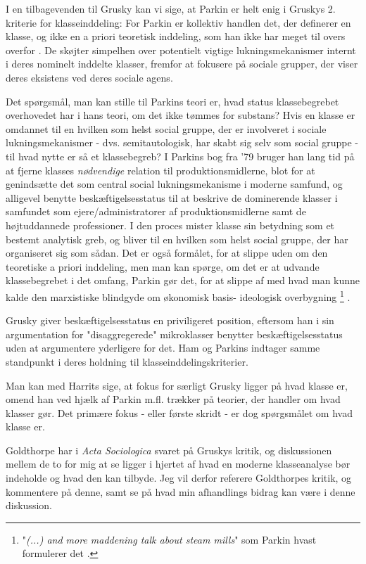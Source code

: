 I en tilbagevenden til Grusky kan vi sige, at Parkin er helt enig i Gruskys 2. kriterie for klasseinddeling: For Parkin er kollektiv handlen det, der definerer en klasse, og ikke en a priori teoretisk inddeling, som han ikke har meget til overs overfor \parencite[113]{Parkin1979}. De skøjter simpelhen over potentielt vigtige lukningsmekanismer internt i deres nominelt inddelte klasser, fremfor at fokusere på sociale grupper, der viser deres eksistens ved deres sociale agens. 

Det spørgsmål, man kan stille til Parkins teori er, hvad status klassebegrebet overhovedet har i hans teori, om det ikke tømmes for substans? Hvis en klasse er omdannet til en hvilken som helst social gruppe, der er involveret i sociale lukningsmekanismer - dvs. semitautologisk, har skabt sig selv som social gruppe - til hvad nytte er så et klassebegreb? I Parkins bog fra '79 bruger han lang tid på at fjerne klasses \emph{nødvendige} relation til produktionsmidlerne, blot for at genindsætte det som central social lukningsmekanisme i moderne samfund, og alligevel benytte beskæftigelsesstatus til at beskrive de dominerende klasser i samfundet som ejere/administratorer af produktionsmidlerne samt de højtuddannede professioner. I den proces mister klasse sin betydning som et bestemt analytisk greb, og bliver til en hvilken som helst social gruppe, der har organiseret sig som sådan. Det er også formålet, for at slippe uden om den teoretiske a priori inddeling, men man kan spørge, om det er at udvande klassebegrebet i det omfang, Parkin gør det, for at slippe af med hvad man kunne kalde den marxistiske blindgyde om økonomisk basis- ideologisk overbygning%
%
\footnote{"\emph{(...) and more maddening talk about steam mills}" som Parkin hvast formulerer det \parencite[6]{Parkin1979}.}%
%
. 

Grusky giver beskæftigelsesstatus en priviligeret position, eftersom han i sin argumentation for "disaggregerede" mikroklasser benytter beskæftigelsesstatus uden at argumentere yderligere for det. %
Ham og Parkins indtager samme standpunkt i deres holdning til klasseinddelingskriterier.

Man kan med Harrits sige, at fokus for særligt Grusky ligger på hvad klasse er, omend han ved hjælk af Parkin m.fl. trækker på teorier, der handler om hvad klasser gør. Det primære fokus - eller første skridt - er dog spørgsmålet om hvad klasse er. 

Goldthorpe har i \emph{Acta Sociologica} svaret på Gruskys kritik, og diskussionen mellem de to for mig at se ligger i hjertet af hvad en moderne klasseanalyse bør indeholde og hvad den kan tilbyde. Jeg vil derfor referere Goldthorpes kritik, og kommentere på denne, samt se på hvad min afhandlings bidrag kan være i denne diskussion. 


